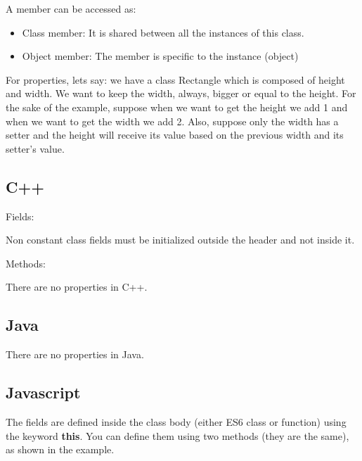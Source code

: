 \documentclass{KodeBook}
\begin{document}
A member can be accessed as: 
\begin{itemize}
	\item Class member: It is shared between all the instances of this class.
	\item Object member: The member is specific to the instance (object)
\end{itemize}

For properties, lets say: we have a class Rectangle which is composed of height and width. 
We want to keep the width, always, bigger or equal to the height.
For the sake of the example, suppose when we want to get the height we add 1 and when we want to get the width we add 2.
Also, suppose only the width has a setter and the height will receive its value based on the previous width and its setter's value.

\subsection{C++}

Fields: 


Non constant class fields must be initialized outside the header and not inside it. 

 

Methods:





There are no properties in C++.

\subsection{Java}





There are no properties in Java.


\subsection{Javascript}

The fields are defined inside the class body (either ES6 class or function) using the keyword \textbf{this}. 
You can define them using two methods (they are the same), as shown in the example.
\end{document}
